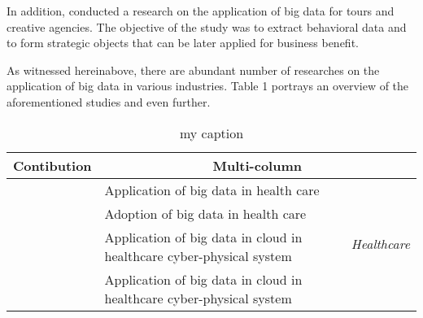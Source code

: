 In addition, \cite{Zhang2019a} conducted a research on the application of big data for tours and creative agencies. The objective of the study was to extract behavioral data and to form strategic objects that can be later applied for business benefit.

As witnessed hereinabove, there are abundant number of researches on the application of big data in various industries. Table 1 portrays an overview of the aforementioned studies and even further.

\begin{center}
    \renewcommand{\arraystretch}{1.5}
    \begin{longtable}{|p{4cm}|p{8cm}|p{1cm}|}
        \caption{my caption}                                                                                                                                                                                                     \\
        \hline
        Contibution                & \multicolumn{2}{c|}{Multi-column}                                                                                                                                                           \\
        \hline
        \cite{Luo2016}             & Application of big data in health care                                                                                                        & \multirow{10}{*}{\begin{turn}{-90} \textit{Healthcare} \end{turn}} \\

        \cite{Murdoch2013}         & Adoption of big data in health care                                                                                                           &                                             \\

        \cite{Zhang2015}           & Application of big data in cloud in healthcare cyber-physical system                                                                          &                                             \\

        \cite{Zhang2015}           & Application of big data in cloud in healthcare cyber-physical system                                                                          &                                             \\


\end{longtable}
\end{center}
